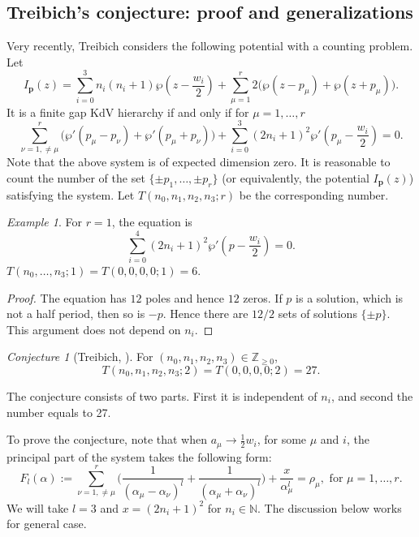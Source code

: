 \documentclass[11pt]{amsart}
\theoremstyle{remark}
\newtheorem{conjecture}[theorem]{Conjecture}
\newtheorem{example}[theorem]{Example}
\numberwithin{equation}{section}
\begin{document}
\subsection{Treibich's conjecture: proof and generalizations}
Very recently, Treibich \cite{Treibich_2025} considers the following potential with a counting problem. Let
\[
    I_{\mathbf{p}}(z) = \sum_{i=0}^3 n_i(n_i+1) \wp(z-\frac{w_i}{2}) + \sum_{\mu=1}^r 2 \Big(\wp(z-p_\mu) + \wp(z+p_\mu)  \Big)   .
\]
It is a finite gap KdV hierarchy if and only if for $\mu=1,\dots,r$
\begin{equation} \label{Eqn_finite_gap}
    \sum_{\nu =1, \neq \mu}^r \Big( \wp'(p_\mu-p_\nu) + \wp'(p_\mu+p_\nu) \Big) + \sum_{i=0}^3 (2n_i+1)^2 \wp'(p_\mu - \frac{w_i}{2}) =0.
\end{equation}
Note that the above system is of expected dimension zero. It is reasonable to count the number of the set $\{\pm p_1,\dots,\pm p_r\}$ (or equivalently, the potential $I_{\mathbf{p}}(z)$) satisfying the system. Let $T(n_0,n_1,n_2,n_3;r)$ be the corresponding number. 
\begin{example}\label{e:Treivich_r_1} For $r=1$, the equation is
\[
    \sum_{i=0}^4 (2n_i+1)^2 \wp'(p - \frac{w_i}{2}) =0.
\]
$T(n_0,\dots,n_3;1)= T(0,0,0,0;1) =6$. 
\begin{proof}
The equation has $12$ poles and hence $12$ zeros. If $p$ is a solution, which is not a half period, then so is $-p$. Hence there are $12/2$ sets of solutions $\{ \pm p \}$. This argument does not depend on $n_i$. 
\end{proof}
\end{example}
\begin{conjecture}[{Treibich, \cite{Treibich_2025}}]
For $(n_0,n_1,n_2,n_3) \in \mathbb{Z}_{\geq 0}$, 
\[
    T(n_0,n_1,n_2,n_3;2) = T(0,0,0,0;2) = 27.
\]
\end{conjecture}
The conjecture consists of two parts. First it is independent of $n_i$, and second the number equals to 27. 


To prove the conjecture, note that when $a_\mu \rightarrow \frac{1}{2} w_i$, for some $\mu$ and $i$, the principal part of the system takes the following form:
\begin{equation} \label{eqn_finite_gap_principal}
    F_l(\alpha):=\sum_{\nu=1, \neq \mu}^r \Big(\frac{1}{(\alpha_\mu - \alpha_\nu)^l} + \frac{1}{(\alpha_\mu + \alpha_\nu)^l} \Big) + \frac{x}{\alpha_{\mu}^l} = \rho_{\mu}, \text{ for }\mu=1,\dots,r.
\end{equation}
We will take $l=3$ and $x = (2n_i+1)^2$ for $n_i \in \mathbb{N}$. The discussion below works for general case. 
\end{document}
